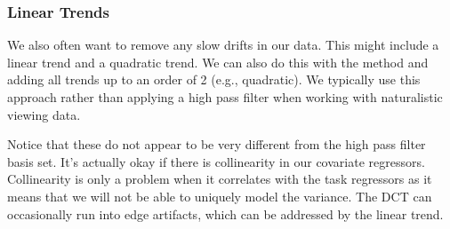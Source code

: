 \documentclass[letterpaper,10pt,english]{sphinxmanual}
\begin{document}
\begin{sphinxVerbatim}[commandchars=\\\{\}]
  
\end{sphinxVerbatim}

\noindent{}


\subsubsection{Linear Trends}
\label{\detokenize{content/GLM_Single_Subject_Model:linear-trends}}
We also often want to remove any slow drifts in our data.  This might include a linear trend and a quadratic trend. We can also do this with the  method and adding all trends up to an order of 2 (e.g., quadratic). We typically use this approach rather than applying a high pass filter when working with naturalistic viewing data.

Notice that these do not appear to be very different from the high pass filter basis set. It’s actually okay if there is collinearity in our covariate regressors. Collinearity is only a problem when it correlates with the task regressors as it means that we will not be able to uniquely model the variance. The DCT can occasionally run into edge artifacts, which can be addressed by the linear trend.

\begin{sphinxVerbatim}[commandchars=\\\{\}]
   
\end{sphinxVerbatim}

\noindent{}
\end{document}
